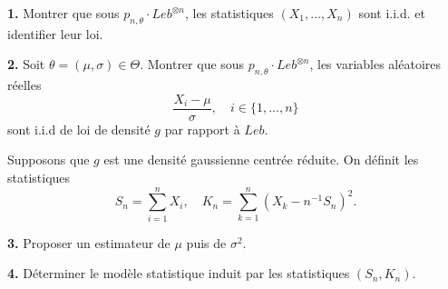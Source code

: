 \documentclass[french]{article}
\begin{document}
	\begin{tcolorbox}[colback=gray!5!white,colframe=gray!75!black]
		\textbf{1.} Montrer que sous $p_{n, \theta} \cdot Leb^{\otimes n}$, les statistiques $(X_1,...,X_n)$ sont i.i.d. et identifier leur loi.
	\end{tcolorbox}
	
	\begin{tcolorbox}[colback=gray!5!white,colframe=gray!75!black]
		\textbf{2.} Soit $\theta = (\mu, \sigma) \in \Theta$. Montrer que sous $p_{n, \theta} \cdot Leb^{\otimes n}$, les variables aléatoires réelles
		\[\frac{X_i - \mu}{\sigma}, \quad i \in \{1,...,n\}\]
		sont i.i.d de loi de densité $g$ par rapport à $Leb$.
	\end{tcolorbox}
	
	\begin{tcolorbox}[colback=yellow!5!white,colframe=yellow!75!black]
		Supposons que $g$ est une densité gaussienne centrée réduite. On définit les statistiques
		\[S_n = \sum_{i=1}^{n} X_i, \quad K_n = \sum_{k=1}^{n} (X_k - n^{-1}S_n)^2.\]
	\end{tcolorbox}
	
	\begin{tcolorbox}[colback=gray!5!white,colframe=gray!75!black]
		\textbf{3.} Proposer un estimateur de $\mu$ puis de $\sigma^2$.
	\end{tcolorbox}
	
	\begin{tcolorbox}[colback=gray!5!white,colframe=gray!75!black]
		\textbf{4.} Déterminer le modèle statistique induit par les statistiques $(S_n, K_n)$.
	\end{tcolorbox}
\end{document}
